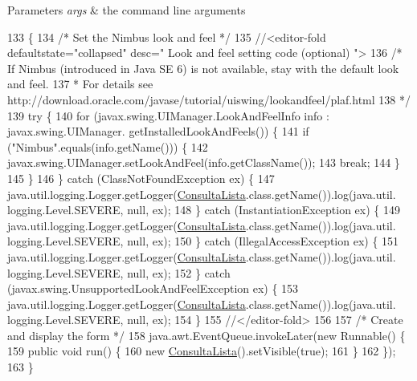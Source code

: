 \begin{DoxyParams}{Parameters}
{\em args} & the command line arguments \\
\hline
\end{DoxyParams}

\begin{DoxyCode}
133                                            \{
134         \textcolor{comment}{/* Set the Nimbus look and feel */}
135         \textcolor{comment}{//<editor-fold defaultstate="collapsed" desc=" Look and feel setting code (optional) ">}
136         \textcolor{comment}{/* If Nimbus (introduced in Java SE 6) is not available, stay with the default look and feel.}
137 \textcolor{comment}{         * For details see http://download.oracle.com/javase/tutorial/uiswing/lookandfeel/plaf.html }
138 \textcolor{comment}{         */}
139         \textcolor{keywordflow}{try} \{
140             \textcolor{keywordflow}{for} (javax.swing.UIManager.LookAndFeelInfo info : javax.swing.UIManager.
      getInstalledLookAndFeels()) \{
141                 \textcolor{keywordflow}{if} (\textcolor{stringliteral}{"Nimbus"}.equals(info.getName())) \{
142                     javax.swing.UIManager.setLookAndFeel(info.getClassName());
143                     \textcolor{keywordflow}{break};
144                 \}
145             \}
146         \} \textcolor{keywordflow}{catch} (ClassNotFoundException ex) \{
147             java.util.logging.Logger.getLogger(\mbox{\hyperlink{class_interfaz_package_1_1_consulta_lista_ae50be7402a33e7d40901ce450fe3d95b}{ConsultaLista}}.class.getName()).log(java.util.
      logging.Level.SEVERE, null, ex);
148         \} \textcolor{keywordflow}{catch} (InstantiationException ex) \{
149             java.util.logging.Logger.getLogger(\mbox{\hyperlink{class_interfaz_package_1_1_consulta_lista_ae50be7402a33e7d40901ce450fe3d95b}{ConsultaLista}}.class.getName()).log(java.util.
      logging.Level.SEVERE, null, ex);
150         \} \textcolor{keywordflow}{catch} (IllegalAccessException ex) \{
151             java.util.logging.Logger.getLogger(\mbox{\hyperlink{class_interfaz_package_1_1_consulta_lista_ae50be7402a33e7d40901ce450fe3d95b}{ConsultaLista}}.class.getName()).log(java.util.
      logging.Level.SEVERE, null, ex);
152         \} \textcolor{keywordflow}{catch} (javax.swing.UnsupportedLookAndFeelException ex) \{
153             java.util.logging.Logger.getLogger(\mbox{\hyperlink{class_interfaz_package_1_1_consulta_lista_ae50be7402a33e7d40901ce450fe3d95b}{ConsultaLista}}.class.getName()).log(java.util.
      logging.Level.SEVERE, null, ex);
154         \}
155         \textcolor{comment}{//</editor-fold>}
156 
157         \textcolor{comment}{/* Create and display the form */}
158         java.awt.EventQueue.invokeLater(\textcolor{keyword}{new} Runnable() \{
159             \textcolor{keyword}{public} \textcolor{keywordtype}{void} run() \{
160                 \textcolor{keyword}{new} \mbox{\hyperlink{class_interfaz_package_1_1_consulta_lista_ae50be7402a33e7d40901ce450fe3d95b}{ConsultaLista}}().setVisible(\textcolor{keyword}{true});
161             \}
162         \});
163     \}
\end{DoxyCode}


